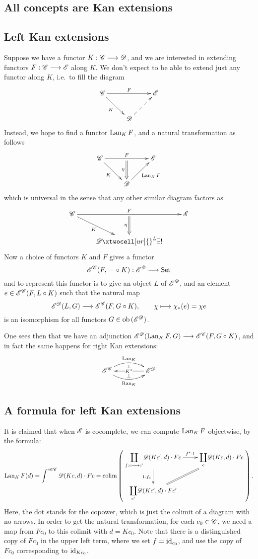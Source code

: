 \documentclass[11pt]{article}
\begin{document}
\begin{1. Kan Extensions}
\section*{All concepts are Kan extensions}
\subsection*{Left Kan extensions}
Suppose we have a functor $K:\mathscr{C}\longrightarrow\mathscr{D}$, and we are interested in extending functors $F:\mathscr{C}\longrightarrow\mathscr{E}$ along $K$. We don't expect to be able to extend just any functor along $K$, i.e.\ to fill the diagram
\[\xymatrix{
\scrC\ar[rr]^-{F}_-{}="1" \ar[rd]_-{K}&%
&%
\scrE\\%
&%
\scrD\ar@{-->}[ru]&%
}\]
Instead, we hope to find a functor $\operatorname{Lan}_KF$, and a natural transformation as follows
\[\xymatrix{
\scrC\ar[rd]_-{K}\ar[rr]^-{F}_-{}="arF"&%
&%
\scrE\\%
&%
\scrD\ar@{->}[ur]_{\Lan_KF}\ar@{=>}"arF";[]_-{\eta}&%
}\]
which is universal in the sense that any other similar diagram factors as
\[\xymatrix{
\scrC\ar[rd]_-{K}\ar[rr]^-{F}_-{}="arF"&%
&%
\scrE\\%
&%
\scrD\ar@{=>}"arF";[]_-{\eta}
\xtwocell[ur]{}^{L}{{\exists!}}&%
}\]
Now a choice of functors $K$ and $F$ gives a functor 
\[\mathscr{E}^{\mathscr{C}}(F,\textup{---}\circ K):\mathscr{E}^{\mathscr{D}}\longrightarrow\operatorname{{\mathsf{Set}}}\]
and to represent this functor is to give an object $L$ of $\mathscr{E}^{\mathscr{D}}$, and an element $e\in \mathscr{E}^{\mathscr{C}}(F,L\circ K)$ such that the natural map
\[\mathscr{E}^{\mathscr{D}}(L,G)\longrightarrow \mathscr{E}^{\mathscr{C}}(F,G\circ K),\qquad \chi\longmapsto \chi_*(e)=\chi e\]
is an isomorphism for all functors $G\in\textup{ob}\,(\mathscr{E}^{\mathscr{D}})$.

One sees then that we have an adjunction $\mathscr{E}^{\mathscr{D}}(\operatorname{Lan}_KF,G)\longrightarrow \mathscr{E}^{\mathscr{C}}(F,G\circ K)$, and in fact the same happens for right Kan extensions:
\[\xymatrix@C=1.5cm{
\scrE^\scrC\ar@/^1.2em/[r]^-{\Lan_K}_-{\perp} \ar@/_1.2em/[r]_-{\Ran_K}^-{\perp}&%
\scrE^\scrD\ar[l]|{K^*}%
}\]
\subsection*{A formula for left Kan extensions}
It is claimed that when $\mathscr{E}$ is cocomplete, we can compute $\operatorname{Lan}_KF$ objectwise, by the formula:
\[\Lan_KF(d)=\int^{c\in\scrC}\scrD(Kc,d)\cdot Fc=
\colim\left(\vcenter{\xymatrix{
{\displaystyle\coprod_{f:c\to c'}}\scrD(Kc',d)\cdot Fc\ar[r]^-{f^*\cdot1}\ar[d]_-{1\cdot f_*}&%
{\displaystyle\coprod_{c}}\scrD(Kc,d)\cdot Fc\ar@{=}[ld]\\%
{\displaystyle\coprod_{c'}}\scrD(Kc',d)\cdot Fc'&%
}}\right)
.\]
Here, the dot stands for the copower, which is just the colimit of a diagram with no arrows. In order to get the natural transformation, for each $c_0\in\mathscr{C}$, we need a map from $Fc_0$ to this colimit with $d=Kc_0$. 
Note that there is a distinguished copy of $Fc_0$ in the upper left term, where we set $f=\textup{id}_{c_0}$, and use the copy of $Fc_0$  corresponding to $\textup{id}_{Kc_0}$.


\end{1. Kan Extensions}
\end{document}
